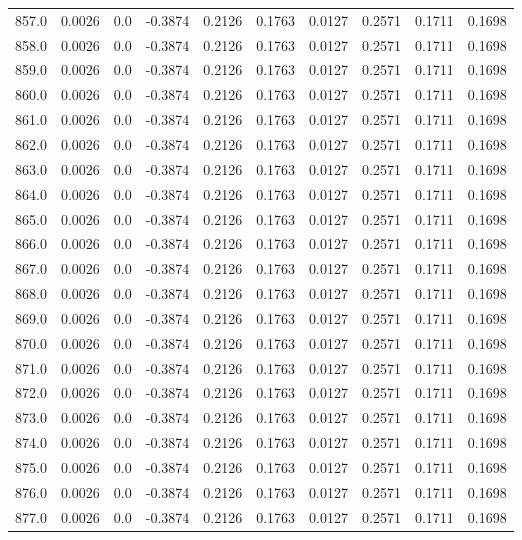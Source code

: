 \begin{longtable}{lrrrrrrrrr}
857.0 & 0.0026 & 0.0 & -0.3874 & 0.2126 & 0.1763 & 0.0127 & 0.2571 & 0.1711 & 0.1698 \\
858.0 & 0.0026 & 0.0 & -0.3874 & 0.2126 & 0.1763 & 0.0127 & 0.2571 & 0.1711 & 0.1698 \\
859.0 & 0.0026 & 0.0 & -0.3874 & 0.2126 & 0.1763 & 0.0127 & 0.2571 & 0.1711 & 0.1698 \\
860.0 & 0.0026 & 0.0 & -0.3874 & 0.2126 & 0.1763 & 0.0127 & 0.2571 & 0.1711 & 0.1698 \\
861.0 & 0.0026 & 0.0 & -0.3874 & 0.2126 & 0.1763 & 0.0127 & 0.2571 & 0.1711 & 0.1698 \\
862.0 & 0.0026 & 0.0 & -0.3874 & 0.2126 & 0.1763 & 0.0127 & 0.2571 & 0.1711 & 0.1698 \\
863.0 & 0.0026 & 0.0 & -0.3874 & 0.2126 & 0.1763 & 0.0127 & 0.2571 & 0.1711 & 0.1698 \\
864.0 & 0.0026 & 0.0 & -0.3874 & 0.2126 & 0.1763 & 0.0127 & 0.2571 & 0.1711 & 0.1698 \\
865.0 & 0.0026 & 0.0 & -0.3874 & 0.2126 & 0.1763 & 0.0127 & 0.2571 & 0.1711 & 0.1698 \\
866.0 & 0.0026 & 0.0 & -0.3874 & 0.2126 & 0.1763 & 0.0127 & 0.2571 & 0.1711 & 0.1698 \\
867.0 & 0.0026 & 0.0 & -0.3874 & 0.2126 & 0.1763 & 0.0127 & 0.2571 & 0.1711 & 0.1698 \\
868.0 & 0.0026 & 0.0 & -0.3874 & 0.2126 & 0.1763 & 0.0127 & 0.2571 & 0.1711 & 0.1698 \\
869.0 & 0.0026 & 0.0 & -0.3874 & 0.2126 & 0.1763 & 0.0127 & 0.2571 & 0.1711 & 0.1698 \\
870.0 & 0.0026 & 0.0 & -0.3874 & 0.2126 & 0.1763 & 0.0127 & 0.2571 & 0.1711 & 0.1698 \\
871.0 & 0.0026 & 0.0 & -0.3874 & 0.2126 & 0.1763 & 0.0127 & 0.2571 & 0.1711 & 0.1698 \\
872.0 & 0.0026 & 0.0 & -0.3874 & 0.2126 & 0.1763 & 0.0127 & 0.2571 & 0.1711 & 0.1698 \\
873.0 & 0.0026 & 0.0 & -0.3874 & 0.2126 & 0.1763 & 0.0127 & 0.2571 & 0.1711 & 0.1698 \\
874.0 & 0.0026 & 0.0 & -0.3874 & 0.2126 & 0.1763 & 0.0127 & 0.2571 & 0.1711 & 0.1698 \\
875.0 & 0.0026 & 0.0 & -0.3874 & 0.2126 & 0.1763 & 0.0127 & 0.2571 & 0.1711 & 0.1698 \\
876.0 & 0.0026 & 0.0 & -0.3874 & 0.2126 & 0.1763 & 0.0127 & 0.2571 & 0.1711 & 0.1698 \\
877.0 & 0.0026 & 0.0 & -0.3874 & 0.2126 & 0.1763 & 0.0127 & 0.2571 & 0.1711 & 0.1698 \\

\end{longtable}
